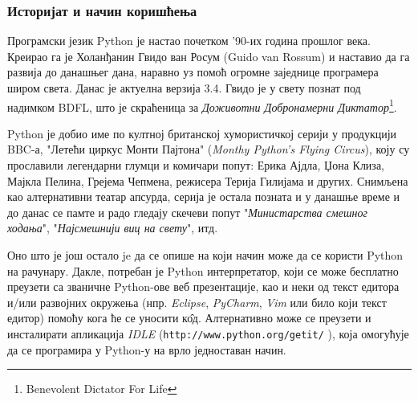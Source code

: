 \subsubsection{Историјат и начин коришћења}
Програмски језик Python је настао почетком '90-их година прошлог века. Креирао га је Холанђанин Гвидо ван Росум (Guido van Rossum) и наставио да га развија до данашњег дана, наравно уз помоћ огромне заједнице програмера широм света. Данас је актуелна верзија 3.4. Гвидо је у свету познат под надимком BDFL, што је скраћеница за \emph{Доживотни Добронамерни Диктатор}\footnote{Benevolent Dictator For Life}.

Python је добио име по култној британској хумористичкој серији у продукцији BBC-а, "Летећи циркус Монти Пајтона" (\emph{Monthy Python's Flying Circus}), коју су прославили легендарни глумци и комичари попут: Ерика Ајдла, Џона Клиза, Мајкла Пелина, Грејема Чепмена, режисера Терија Гилијама и других. Снимљена као алтернативни театар апсурда, серија је остала позната и у данашње време и до данас се памте и радо гледају скечеви попут "\emph{Министарства смешног ходања}", "\emph{Најсмешнији виц на свету}", итд.

Оно што је још остало je да се опише на који начин може да се користи Python на рачунару. Дакле, потребан је Python интерпретатор, који се може бесплатно преузети са званичне Python-ове веб презентације\cite{pythonsite}, као и неки од текст едитора и/или развојних окружења (нпр. \emph{Eclipse}, \emph{PyCharm}, \emph{Vim} или било који текст едитор) помоћу кога ће се уносити к\^{о}д. Алтернативно може се преузети и инсталирати апликација \emph{IDLE} (\texttt{http://www.python.org/getit/} ), која омогућује да се програмира у Python-у на врло једноставан начин.
